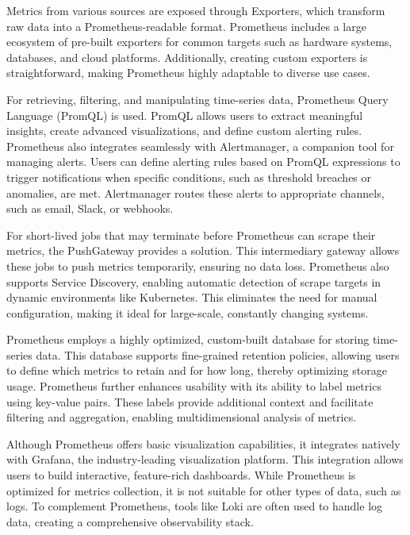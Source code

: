 Metrics from various sources are exposed through Exporters, which transform raw data into a Prometheus-readable format. Prometheus includes a large ecosystem of pre-built exporters for common targets such as hardware systems, databases, and cloud platforms. Additionally, creating custom exporters is straightforward, making Prometheus highly adaptable to diverse use cases.

For retrieving, filtering, and manipulating time-series data, Prometheus Query Language (PromQL) is used. PromQL allows users to extract meaningful insights, create advanced visualizations, and define custom alerting rules. Prometheus also integrates seamlessly with Alertmanager, a companion tool for managing alerts. Users can define alerting rules based on PromQL expressions to trigger notifications when specific conditions, such as threshold breaches or anomalies, are met. Alertmanager routes these alerts to appropriate channels, such as email, Slack, or webhooks.

For short-lived jobs that may terminate before Prometheus can scrape their metrics, the PushGateway provides a solution. This intermediary gateway allows these jobs to push metrics temporarily, ensuring no data loss. Prometheus also supports Service Discovery, enabling automatic detection of scrape targets in dynamic environments like Kubernetes. This eliminates the need for manual configuration, making it ideal for large-scale, constantly changing systems.

Prometheus employs a highly optimized, custom-built database for storing time-series data. This database supports fine-grained retention policies, allowing users to define which metrics to retain and for how long, thereby optimizing storage usage. Prometheus further enhances usability with its ability to label metrics using key-value pairs. These labels provide additional context and facilitate filtering and aggregation, enabling multidimensional analysis of metrics.

Although Prometheus offers basic visualization capabilities, it integrates natively with Grafana, the industry-leading visualization platform. This integration allows users to build interactive, feature-rich dashboards. While Prometheus is optimized for metrics collection, it is not suitable for other types of data, such as logs. To complement Prometheus, tools like Loki are often used to handle log data, creating a comprehensive observability stack.\cite{Jani2024-mg,Pragathi2024-fa}



